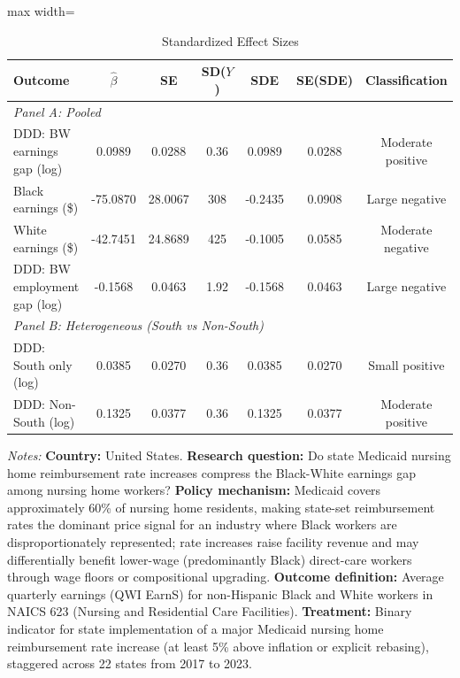
\begin{table}[t]
\centering
\caption{Standardized Effect Sizes}
\label{tab:sde}
\begin{threeparttable}
\begin{adjustbox}{max width=\textwidth}
\begin{tabular}{lcccccc}
\toprule
Outcome & $\hat{\beta}$ & SE & SD($Y$) & SDE & SE(SDE) & Classification \\
\midrule
\multicolumn{7}{l}{\textit{Panel A: Pooled}} \\[3pt]
DDD: BW earnings gap (log) & 0.0989 & 0.0288 & 0.36 & 0.0989 & 0.0288 & Moderate positive \\
Black earnings (\$) & -75.0870 & 28.0067 & 308 & -0.2435 & 0.0908 & Large negative \\
White earnings (\$) & -42.7451 & 24.8689 & 425 & -0.1005 & 0.0585 & Moderate negative \\
DDD: BW employment gap (log) & -0.1568 & 0.0463 & 1.92 & -0.1568 & 0.0463 & Large negative \\
\multicolumn{7}{l}{\textit{Panel B: Heterogeneous (South vs Non-South)}} \\[3pt]
DDD: South only (log) & 0.0385 & 0.0270 & 0.36 & 0.0385 & 0.0270 & Small positive \\
DDD: Non-South (log) & 0.1325 & 0.0377 & 0.36 & 0.1325 & 0.0377 & Moderate positive \\
\bottomrule
\end{tabular}
\end{adjustbox}
\par\vspace{0.3em}
\begin{minipage}{\textwidth}
\footnotesize \textit{Notes:}
\textbf{Country:} United States.
\textbf{Research question:} Do state Medicaid nursing home reimbursement rate increases compress the Black-White earnings gap among nursing home workers?
\textbf{Policy mechanism:} Medicaid covers approximately 60\% of nursing home residents, making state-set reimbursement rates the dominant price signal for an industry where Black workers are disproportionately represented; rate increases raise facility revenue and may differentially benefit lower-wage (predominantly Black) direct-care workers through wage floors or compositional upgrading.
\textbf{Outcome definition:} Average quarterly earnings (QWI EarnS) for non-Hispanic Black and White workers in NAICS 623 (Nursing and Residential Care Facilities).
\textbf{Treatment:} Binary indicator for state implementation of a major Medicaid nursing home reimbursement rate increase (at least 5\% above inflation or explicit rebasing), staggered across 22 states from 2017 to 2023.

\end{minipage}
\end{threeparttable}
\end{table}

